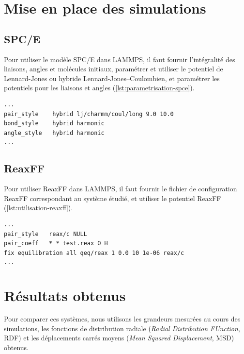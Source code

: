 \documentclass[11pt, a4paper]{article}
\begin{document}
\section{Mise en place des simulations}

	\subsection{SPC/E}

Pour utiliser le modèle SPC/E dans LAMMPS, il faut fournir l'intégralité des liaisons, angles et molécules initiaux, paramétrer et utiliser le potentiel de Lennard-Jones ou hybride Lennard-Jones--Coulombien, et paramétrer les potentiels pour les liaisons et angles (\autoref{lst:parametrisation-spce}).

\begin{lstlisting}[caption={Exemple de paramétrisation pour utiliser le SPC/E}, label={lst:parametrisation-spce}]
...
pair_style    hybrid lj/charmm/coul/long 9.0 10.0
bond_style    hybrid harmonic
angle_style   hybrid harmonic
...
\end{lstlisting}

	\subsection{ReaxFF}

Pour utiliser ReaxFF dans LAMMPS, il faut fournir le fichier de configuration ReaxFF correspondant au système étudié, et utiliser le potentiel ReaxFF (\autoref{lst:utilisation-reaxff}).

\begin{lstlisting}[caption={Exemple d'utilisation du ReaxFF dans LAMMPS}, label={lst:utilisation-reaxff}]
...
pair_style   reax/c NULL
pair_coeff   * * test.reax O H
fix equilibration all qeq/reax 1 0.0 10 1e-06 reax/c
...
\end{lstlisting}

\section{Résultats obtenus}

Pour comparer ces systèmes, nous utilisons les grandeurs mesurées au cours des simulations, les fonctions de distribution radiale (\emph{Radial Distribution FUnction}, RDF) et les déplacements carrés moyens (\emph{Mean Squared Displacement}, MSD) obtenus.


\clearpage
\printbibliography
\end{document}

